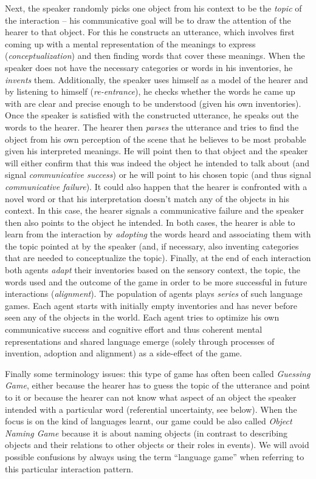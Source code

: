 Next, the speaker randomly picks one object from his context to be the
\emph{topic} of the interaction -- his communicative goal will be to
draw the attention of the hearer to that object. For this he
constructs an utterance, which involves first coming up with a mental
representation of the meanings to express (\emph{conceptualization})
and then finding words that cover these meanings. When the speaker
does not have the necessary categories or words in his inventories, he
\emph{invents} them. Additionally, the speaker uses himself as a model
of the hearer and by listening to himself (\emph{re-entrance}), he
checks whether the words he came up with are clear and precise enough
to be understood (given his own inventories). Once the speaker is
satisfied with the constructed utterance, he speaks out the words to
the hearer. The hearer then \emph{parses} the utterance and tries to
find the object from his own perception of the scene that he believes
to be most probable given his interpreted meanings. He will point then
to that object and the speaker will either confirm that this was
indeed the object he intended to talk about (and signal
\emph{communicative success}) or he will point to his chosen topic
(and thus signal \emph{communicative failure}). It could also happen
that the hearer is confronted with a novel word or that his
interpretation doesn't match any of the objects in his context. In
this case, the hearer signals a communicative failure and the speaker
then also points to the object he intended. In both cases, the hearer
is able to learn from the interaction by \emph{adopting} the words
heard and associating them with the topic pointed at by the speaker
(and, if necessary, also inventing categories that are needed to
conceptualize the topic). Finally, at the end of each interaction both
agents \emph{adapt} their inventories based on the sensory context,
the topic, the words used and the outcome of the game in order to be
more successful in future interactions (\emph{alignment}).  The
population of agents plays \emph{series} of such language games. Each
agent starts with initially empty inventories and has never before
seen any of the objects in the world. Each agent tries to optimize his
own communicative success and cognitive effort and thus coherent
mental representations and shared language emerge (solely through
processes of invention, adoption and alignment) as a side-effect of
the game.

Finally some terminology issues: this type of game has often been
called \emph{Guessing Game}, either because the hearer has to guess
the topic of the utterance and point to it or because the hearer can
not know what aspect of an object the speaker intended with a
particular word (referential uncertainty, see below). When the focus
is on the kind of languages learnt, our game could be also called
\emph{Object Naming Game} because it is about naming objects (in
contrast to describing objects and their relations to other objects or
their roles in events). We will avoid possible confusions by always
using the term ``language game'' when referring to this particular
interaction pattern.


